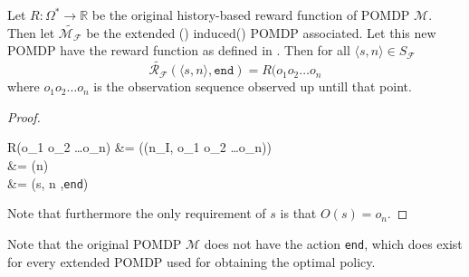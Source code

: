\begin{lemma}
Let $R:\Omega^*\to\mathbb{R}$ be the original history-based reward function of POMDP $\mathcal{M}$. Then let $\widetilde{\mathcal{M}_\mathcal{F}}$ be the extended () induced() POMDP associated. Let this new POMDP have the reward function as defined in . Then for all $\langle s,n\rangle \in S_\mathcal{F}$ 
\[ \widetilde{\mathcal{R}_\mathcal{F}}(\langle s,n\rangle,\texttt{end}) = R(o_1 o_2 \dots o_n \]
where $o_1 o_2 \dots o_n$ is the observation sequence observed up untill that point. 
\end{lemma}
\begin{proof}
	\begin{flalign*}
	R(o_1 o_2 \dots o_n) &= \sigma(\delta*(n_I, o_1 o_2 \dots o_n))  \hfill {} \\
	&= \sigma(n) \\
	&= (\langle s, n \rangle,\texttt{end}) \hfill {}
	\end{flalign*}
Note that furthermore the only requirement of $s$ is that $O(s) = o_n$.
\end{proof}

Note that the original POMDP $\mathcal{M}$ does not have the action \texttt{end}, which does exist for every extended POMDP used for obtaining the optimal policy. 